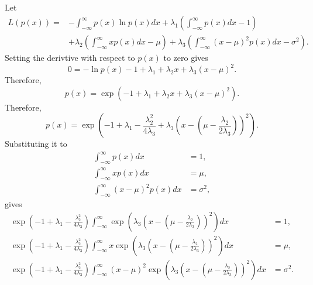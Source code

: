 \subsection{}
\label{1.34}
Let
%
\begin{equation}
\begin{aligned}
L(p(x)) 
=&
- 
\int_{- \infty}^{\infty} 
p(x) 
\ln p(x) 
dx 
+ 
\lambda_1 
\left( 
	\int_{- \infty}^{\infty} 
	p(x) 
	dx 
	- 
	1 
\right) \\
&+ 
\lambda_2 
\left( 
	\int_{- \infty}^{\infty} 
	x 
	p(x) 
	dx 
	- 
	\mu 
\right) 
+ 
\lambda_3 
\left( 
	\int_{-\infty}^{\infty} 
	(x - \mu) ^ 2 
	p(x) 
	dx 
	- 
	\sigma ^ 2 
\right).
\end{aligned}
\end{equation}
%
Setting the derivtive with respect to $p(x)$ to zero gives
%
\begin{equation}
0 
= 
- 
\ln p(x) 
- 
1 
+ 
\lambda_1 
+ 
\lambda_2 
x 
+ 
\lambda_3 
(x - \mu) ^ 2.
\end{equation}
%
Therefore,
%
\begin{equation}
p(x) 
= 
\exp 
\left( 
	- 1 
	+ 
	\lambda_1 
	+ 
	\lambda_2 
	x 
	+ 
	\lambda_3 
	(x - \mu) ^ 2 
\right).
\end{equation}
%
Therefore,
%
\begin{equation}
p(x) 
= 
\exp 
\left( 
	- 
	1 
	+ 
	\lambda_1 
	- 
	\frac{\lambda_2 ^ 2}{4 \lambda_3} 
	+ 
	\lambda_3 
	\left( 
		x 
		- 
		\left( 
			\mu 
			- 
			\frac{\lambda_2}{2 \lambda_3} 
		\right) 
	\right) ^ 2 
\right).
\end{equation}
%
Substituting it to 
%
\begin{equation}
\begin{aligned}
\int_{- \infty}^{\infty} 
p(x) 
dx 
&= 
1, \\
\int_{- \infty}^{\infty} 
x 
p(x) 
dx 
&= 
\mu, \\
\int_{- \infty}^{\infty} 
(x - \mu) ^ 2 
p(x) 
dx 
&= 
\sigma ^ 2,
\end{aligned}
\end{equation}
%
gives
%
\begin{equation}
\begin{aligned}
\exp 
\left( 
	- 
	1 
	+ 
	\lambda_1 
	- 
	\frac{\lambda_2 ^ 2}{4 \lambda_3} 
\right) 
\int_{- \infty}^{\infty} 
\exp 
\left( 
	\lambda_3 
	\left( 
		x 
		- 
		\left( 
			\mu 
			- 
			\frac{\lambda_2}{2 \lambda_3} 
		\right) 
	\right) ^ 2 
\right) dx 
&= 
1, \\
\exp 
\left( 
	- 
	1 
	+ 
	\lambda_1 
	- 
	\frac{\lambda_2 ^ 2}{4 \lambda_3} 
\right) 
\int_{- \infty}^{\infty} 
x 
\exp 
\left( 
	\lambda_3 
	\left( 
		x 
		- 
		\left( 
			\mu 
			- 
			\frac{\lambda_2}{2 \lambda_3} 
		\right) 
	\right) ^ 2 
\right) 
dx 
&= 
\mu, \\
\exp 
\left( 
	- 
	1 
	+ 
	\lambda_1 
	- 
	\frac{\lambda_2 ^ 2}{4 \lambda_3} 
\right) 
\int_{- \infty}^{\infty} 
(x - \mu) ^ 2 
\exp 
\left( 
	\lambda_3 
	\left( 
		x 
		- 
		\left( 
			\mu 
			-
			 \frac{\lambda_2}{2 \lambda_3} 
		\right) 
	\right) ^ 2 
\right) 
dx 
&= 
\sigma ^ 2.
\end{aligned}
\end{equation}
